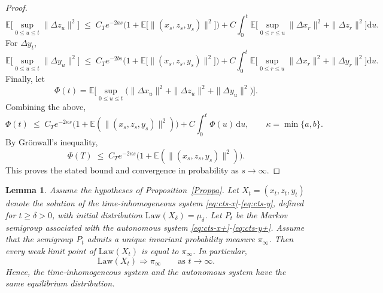 \documentclass[11pt, a4paper,leqno]{amsart}
\newtheorem{lemma}{Lemma}[section]
\theoremstyle{definition}
\numberwithin{equation}{section}
\begin{document}
\begin{proof}
\[
\mathbb{E}\Big[\sup_{0\le u\le t}\|\Delta z_u\|^2\Big]
\;\le\; C_T e^{-2as}\big(1+\mathbb{E}\bigl [\|(x_s,z_s,y_s)\|^2\bigr ]\big)
+ C \int_0^t \mathbb{E}\Big[\sup_{0\le r\le u}\|\Delta x_r\|^2+\|\Delta z_r\|^2\Big]\mathrm{d}u.
\]
For $\Delta y_t$,
\[
\mathbb{E}\Big[\sup_{0\le u\le t}\|\Delta y_u\|^2\Big]
\;\le\; C_T e^{-2bs}\big(1+\mathbb{E}\bigl [\|(x_s,z_s,y_s)\|^2\bigr ]\big)
+ C \int_0^t \mathbb{E}\Big[\sup_{0\le r\le u}\|\Delta x_r\|^2+\|\Delta y_r\|^2\Big]\mathrm{d}u.
\]
Finally, let
\[
\Phi(t)=\mathbb{E}\Big[\sup_{0\le u\le t}\big(\|\Delta x_u\|^2+\|\Delta z_u\|^2+\|\Delta y_u\|^2\big)\Big].
\]
Combining the above,
\[
\Phi(t) \;\le\; C_T e^{-2\kappa s}\big(1+\mathbb{E}(\|(x_s,z_s,y_s)\|^2)\big)
+ C\int_0^t \Phi(u)\,\mathrm{d}u,
\qquad \kappa=\min\{a,b\}.
\]
By Grönwall’s inequality,
\[
\Phi(T)\;\le\; C_T e^{-2\kappa s}\big(1+\mathbb{E}(\|(x_s,z_s,y_s)\|^2)\big).
\]
This proves the stated bound and convergence in probability as $s\to\infty$.
\end{proof}



\begin{lemma}\label{thm:same-equilibrium}
Assume the hypotheses of Proposition~\ref{Proppa}.
Let \(X_t=(x_t,z_t,y_t)\) denote the solution of the time-inhomogeneous system
\eqref{eq:cts-x}-\eqref{eq:cts-y}, defined for \(t\ge \delta>0\), with initial distribution
\(\mathrm{Law}(X_\delta)=\mu_\delta\).
Let \(P_t\) be the Markov semigroup associated with the autonomous system
\eqref{eq:cts-x+}-\eqref{eq:cts-y+}. Assume that the semigroup \(P_t\) admits a unique invariant probability measure \(\pi_\infty\). Then every weak limit point of \(\mathrm{Law}(X_t)\) is equal to \(\pi_\infty\).
In particular,
\[
\mathrm{Law}(X_t)\Rightarrow \pi_\infty
\qquad\text{as }t\to\infty.
\]
Hence, the time-inhomogeneous system and the autonomous system have the same
equilibrium distribution.
\end{lemma}
\end{document}
